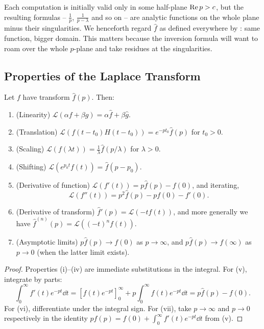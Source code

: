 \documentclass[a4paper]{scrartcl}
\begin{document}
Each computation is initially valid only in some half-plane $\operatorname{Re} p > c$, but the resulting formulas -- $\frac 1p$, $\frac{1}{p - \lambda}$ and so on -- are analytic functions on the whole plane minus their singularities. We henceforth regard $\hat f$ as defined everywhere by : same function, bigger domain. This matters because the inversion formula will want to roam over the whole $p$-plane and take residues at the singularities.

\subsection{Properties of the Laplace Transform}

\begin{proposition}
	Let $f$ have transform $\hat f(p)$. Then:
	\begin{enumerate}[label=(\roman*)]
		\item (Linearity) $\mathcal L(\alpha f + \beta g) = \alpha \hat f + \beta \hat g$.
		\item (Translation) $\mathcal L(f(t - t_0) H(t - t_0)) = e^{-p t_0} \hat f(p)$ for $t_0 > 0$.
		\item (Scaling) $\mathcal L(f(\lambda t)) = \frac{1}{\lambda} \hat f(p/\lambda)$ for $\lambda > 0$.
		\item (Shifting) $\mathcal L(e^{p_0 t} f(t)) = \hat f(p - p_0)$.
		\item (Derivative of function) $\mathcal L(f'(t)) = p \hat f(p) - f(0)$, and iterating,
		$$
		\mathcal L(f''(t)) = p^2 \hat f(p) - p f(0) - f'(0).
		$$
		\item (Derivative of transform) $\hat f'(p) = \mathcal L(-t f(t))$, and more generally we have $\hat f^{(n)}(p) = \mathcal L((-t)^n f(t))$.
		\item (Asymptotic limits) $p \hat f(p) \to f(0)$ as $p \to \infty$, and $p\hat f(p) \to f(\infty)$ as $p \to 0$ (when the latter limit exists).
	\end{enumerate}
\end{proposition}
\begin{proof}
	Properties (i)--(iv) are immediate substitutions in the integral. For (v), integrate by parts:
	$$
	\int_0^\infty f'(t) e^{-pt} \dd t = \left[f(t) e^{-pt}\right]_0^\infty + p \int_0^\infty f(t) e^{-pt}\dd t = p\hat f(p) - f(0).
	$$
	For (vi), differentiate under the integral sign. For (vii), take $p \to \infty$ and $p \to 0$ respectively in the identity $p \hat f(p) = f(0) + \int_0^\infty f'(t) e^{-pt}\dd t$ from (v).
\end{proof}
\end{document}
